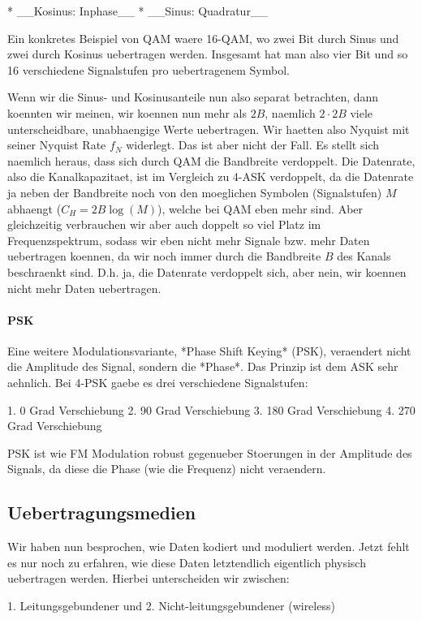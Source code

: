 * \_\_Kosinus: Inphase\_\_
* \_\_Sinus: Quadratur\_\_

Ein konkretes Beispiel von QAM waere 16-QAM, wo zwei Bit durch Sinus und zwei
durch Kosinus uebertragen werden. Insgesamt hat man also vier Bit und so 16
verschiedene Signalstufen pro uebertragenem Symbol.

Wenn wir die Sinus- und Kosinusanteile nun also separat betrachten, dann koennten wir meinen, wir koennen nun mehr als $2B$, naemlich $2 \cdot 2B$ viele unterscheidbare, unabhaengige Werte uebertragen. Wir haetten also Nyquist mit seiner Nyquist Rate $f_N$ widerlegt. Das ist aber nicht der Fall. Es stellt sich naemlich heraus, dass sich durch QAM die Bandbreite verdoppelt. Die Datenrate, also die Kanalkapazitaet, ist im Vergleich zu 4-ASK verdoppelt, da die Datenrate ja neben der Bandbreite noch von den moeglichen Symbolen (Signalstufen) $M$ abhaengt ($C_H = 2B\log(M)$), welche bei QAM eben mehr sind. Aber gleichzeitig verbrauchen wir aber auch doppelt so viel Platz im Frequenzspektrum, sodass wir eben nicht mehr Signale bzw. mehr Daten uebertragen koennen, da wir noch immer durch die Bandbreite $B$ des Kanals beschraenkt sind. D.h. ja, die Datenrate verdoppelt sich, aber nein, wir koennen nicht mehr Daten uebertragen.

\paragraph{ PSK}

Eine weitere Modulationsvariante, *Phase Shift Keying* (PSK), veraendert nicht
die Amplitude des Signal, sondern die *Phase*. Das Prinzip ist dem ASK sehr
aehnlich. Bei 4-PSK gaebe es drei verschiedene Signalstufen:

1. 0 Grad Verschiebung
2. 90 Grad Verschiebung
3. 180 Grad Verschiebung
4. 270 Grad Verschiebung

PSK ist wie FM Modulation robust gegenueber Stoerungen in der Amplitude des
Signals, da diese die Phase (wie die Frequenz) nicht veraendern.

\subsection{ Uebertragungsmedien}

Wir haben nun besprochen, wie Daten kodiert und moduliert werden. Jetzt fehlt
es nur noch zu erfahren, wie diese Daten letztendlich eigentlich physisch
uebertragen werden. Hierbei unterscheiden wir zwischen:

1. Leitungsgebundener und
2. Nicht-leitungsgebundener (wireless)

